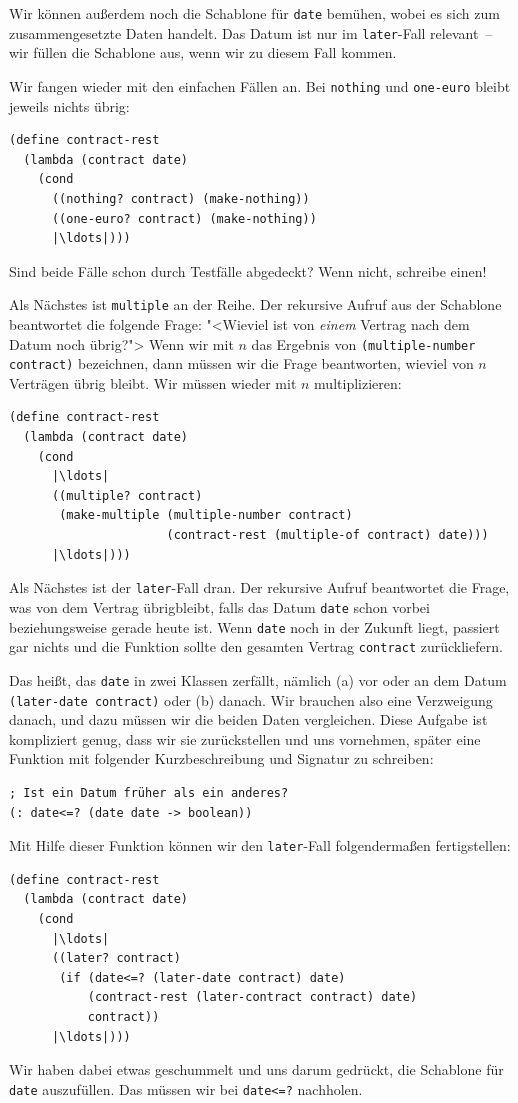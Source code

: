 %
Wir können außerdem noch die Schablone für \lstinline{date} bemühen,
wobei es sich zum zusammengesetzte Daten handelt.  Das Datum ist nur
im \lstinline{later}-Fall relevant~-- wir füllen die Schablone aus,
wenn wir zu diesem Fall kommen.

Wir fangen wieder mit den einfachen Fällen an.  Bei
\lstinline{nothing} und \lstinline{one-euro} bleibt jeweils nichts
übrig:
%
\begin{lstlisting}
(define contract-rest
  (lambda (contract date)
    (cond
      ((nothing? contract) (make-nothing))
      ((one-euro? contract) (make-nothing))
      |\ldots|)))
\end{lstlisting}
%
\begin{aufgabeinline}
  Sind beide Fälle schon durch Testfälle abgedeckt?  Wenn nicht,
  schreibe einen!
\end{aufgabeinline}
%
Als Nächstes ist \lstinline{multiple} an der Reihe.  Der rekursive
Aufruf aus der Schablone beantwortet die folgende Frage: "<Wieviel ist
von \emph{einem} Vertrag nach dem Datum noch übrig?"> Wenn wir mit $n$
das Ergebnis von \lstinline{(multiple-number contract)} bezeichnen,
dann müssen wir die Frage beantworten, wieviel von $n$
Verträgen übrig bleibt.  Wir müssen wieder mit $n$
multiplizieren:
%
\begin{lstlisting}
(define contract-rest
  (lambda (contract date)
    (cond
      |\ldots|
      ((multiple? contract)
       (make-multiple (multiple-number contract)
                      (contract-rest (multiple-of contract) date)))
      |\ldots|)))
\end{lstlisting}
%
Als Nächstes ist der \lstinline{later}-Fall dran.  Der rekursive
Aufruf beantwortet die Frage, was von dem Vertrag übrigbleibt, falls
das Datum \lstinline{date} schon vorbei beziehungsweise gerade heute
ist.  Wenn \lstinline{date} noch in der Zukunft liegt, passiert gar
nichts und die Funktion sollte den gesamten Vertrag
\lstinline{contract} zurückliefern.

Das heißt, das \lstinline{date} in zwei Klassen zerfällt, nämlich (a)
vor oder an dem Datum \lstinline{(later-date contract)} oder (b)
danach.  Wir brauchen also eine Verzweigung danach, und dazu müssen
wir die beiden Daten vergleichen.  Diese Aufgabe ist
kompliziert genug, dass wir sie zurückstellen und uns
vornehmen, später eine Funktion mit folgender Kurzbeschreibung
und Signatur zu schreiben:
%
\begin{lstlisting}
; Ist ein Datum früher als ein anderes?
(: date<=? (date date -> boolean))
\end{lstlisting}
%
Mit Hilfe dieser Funktion können wir den \lstinline{later}-Fall
folgendermaßen fertigstellen:
%
\begin{lstlisting}
(define contract-rest
  (lambda (contract date)
    (cond
      |\ldots|
      ((later? contract)
       (if (date<=? (later-date contract) date)
           (contract-rest (later-contract contract) date)
           contract))
      |\ldots|)))
\end{lstlisting}
%
Wir haben dabei etwas geschummelt und uns darum gedrückt, die
Schablone für \lstinline{date} auszufüllen.  Das müssen wir bei
\lstinline{date<=?} nachholen.

